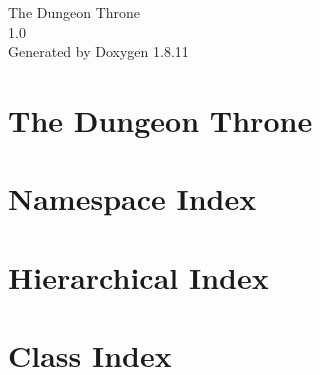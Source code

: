 \documentclass[twoside]{book}
\newcommand{\+}{\discretionary{\mbox{\scriptsize$\hookleftarrow$}}{}{}}
\newcommand{\clearemptydoublepage}{%
  \newpage{\pagestyle{empty}\cleardoublepage}%
}
\begin{document}
\hypersetup{pageanchor=false,
             bookmarksnumbered=true,
             pdfencoding=unicode
            }
\begin{titlepage}
\vspace*{7cm}
\begin{center}%
{\Large The Dungeon Throne \\[1ex]\large 1.\+0 }\\
\vspace*{1cm}
{\large Generated by Doxygen 1.8.11}\\
\end{center}
\end{titlepage}
\clearemptydoublepage
\tableofcontents
\clearemptydoublepage
{}
\hypersetup{pageanchor=true}

\chapter{The Dungeon Throne}
\label{md_README}
\hypertarget{md_README}{}

\chapter{Namespace Index}

\chapter{Hierarchical Index}

\chapter{Class Index}

\end{document}
